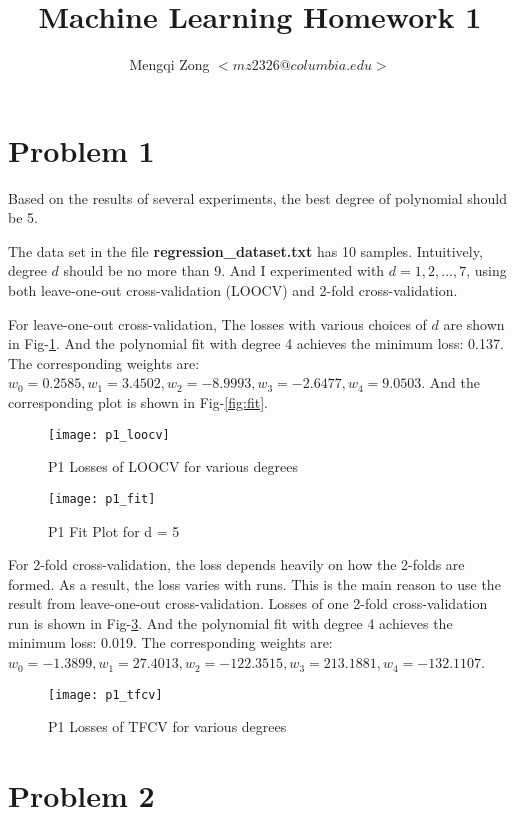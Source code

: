 \documentclass[12pt]{article}
\title{Machine Learning Homework 1}
\author{Mengqi Zong $<mz2326@columbia.edu>$}
\begin{document}
\maketitle

\section{Problem 1}

Based on the results of several experiments, the best degree of polynomial should be 5.

The data set in the file {\bf regression\_dataset.txt} has 10 samples. Intuitively, degree $d$ should be no more than 9. And I experimented with $d = 1, 2, ..., 7$, using both leave-one-out cross-validation (LOOCV) and 2-fold cross-validation.

For leave-one-out cross-validation, The losses with various choices of $d$ are shown in Fig-\ref{fig:p1_loocv}. And the polynomial fit with degree 4 achieves the minimum loss: 0.137. The corresponding weights are: $w_0 = 0.2585, w_1 = 3.4502, w_2 = -8.9993, w_3 = -2.6477, w_4 = 9.0503$. And the corresponding plot is shown in Fig-\ref{fig:fit}.

\begin{figure}[ht!]
  \centering
  \texttt{[image: p1\_loocv]}
  \caption{P1 Losses of LOOCV for various degrees \label{fig:p1_loocv}}
\end{figure}

\begin{figure}[ht!]
  \centering
  \texttt{[image: p1\_fit]}
  \caption{P1 Fit Plot for d = 5 \label{fig:p1_fit}}
\end{figure}

For 2-fold cross-validation, the loss depends heavily on how the 2-folds are formed. As a result, the loss varies with runs. This is the main reason to use the result from leave-one-out cross-validation. Losses of one 2-fold cross-validation run is shown in Fig-\ref{fig:p1_tfcv}. And the polynomial fit with degree 4 achieves the minimum loss: 0.019. The corresponding weights are: $w_0 = -1.3899, w_1 = 27.4013, w_2 = -122.3515, w_3 = 213.1881, w_4 = -132.1107$.

\begin{figure}[ht!]
  \centering
  \texttt{[image: p1\_tfcv]}
  \caption{P1 Losses of TFCV for various degrees \label{fig:p1_tfcv}}
\end{figure}

\section{Problem 2}
\end{document}
